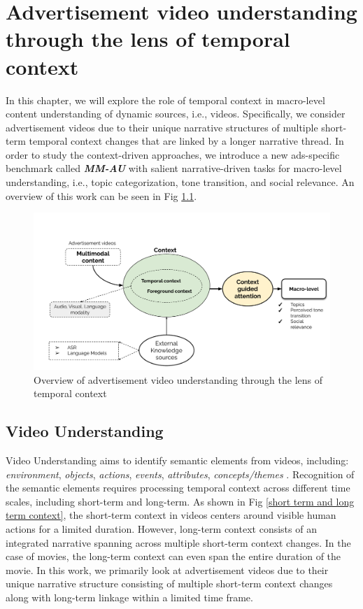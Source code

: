 \chapter{Advertisement video understanding through the lens of temporal context}

In this chapter, we will explore the role of temporal context in macro-level content understanding of dynamic sources, i.e., videos. Specifically, we consider advertisement videos due to their unique narrative structures of multiple short-term temporal context changes that are linked by a longer narrative thread. In order to study the context-driven approaches, we introduce a new ads-specific benchmark called \textbf{\textit{MM-AU}} with salient narrative-driven tasks for macro-level understanding, i.e., topic categorization, tone transition, and social relevance. An overview of this work can be seen in Fig \ref{advertisement video understanding}.

\begin{figure}
    \includegraphics[width=\textwidth]{figures/advertisement_video_understanding.pdf}
    \caption{Overview of advertisement video understanding through the lens of temporal context}
    \label{advertisement video understanding}
\end{figure}

\section{Video Understanding}

Video Understanding aims to identify semantic elements from videos, including: \textit{environment}, \textit{objects}, \textit{actions}, \textit{events}, \textit{attributes}, \textit{concepts/themes} \cite{diba_large_2020}. Recognition of the semantic elements requires processing temporal context across different time scales, including short-term and long-term. As shown in Fig \ref{short term and long term context}, the short-term context in videos centers around visible human actions for a limited duration. However, long-term context consists of an integrated narrative spanning across multiple short-term context changes. In the case of movies, the long-term context can even span the entire duration of the movie. In this work, we primarily look at advertisement videos due to their unique narrative structure consisting of multiple short-term context changes along with long-term linkage within a limited time frame.

